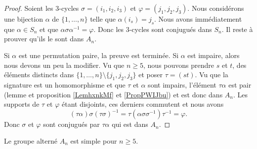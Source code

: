 \begin{proof}
    Soient les \( 3\)-cycles \( \sigma=(i_1,i_2,i_3)\) et \( \varphi=(j_1,j_2,j_3)\). Nous considérons une bijection \( \alpha\) de \( \{ 1,\ldots, n \}\) telle que \( \alpha(i_s)=j_s\). Nous avons immédiatement que \( \alpha\in S_n\) et que \( \alpha\sigma\alpha^{-1}=\varphi\). Donc les \( 3\)-cycles sont conjugués dans \( S_n\). Il reste à prouver qu'ils le sont dans \( A_n\).

    Si \( \alpha\) est une permutation paire, la preuve est terminée. Si \( \alpha\) est impaire, alors nous devons un peu la modifier. Vu que \( n\geq 5\), nous pouvons prendre \( s\) et \( t\), des éléments distincts dans \( \{ 1,\ldots, n \}\setminus\{ j_1,j_2,j_3 \}\) et poser \( \tau=(st)\). Vu que la signature est un homomorphisme et que \( \tau\) et \( \alpha\) sont impairs, l'élément \( \tau\alpha\) est pair (lemme et proposition \ref{LemhxnkMf} et \ref{PropPWIJbu}) et est donc dans \( A_n\). Les supports de \( \tau\) et \( \varphi\) étant disjoints, ces derniers commutent et nous avons
    \begin{equation}
        (\tau\alpha)\sigma(\tau\sigma)^{-1}=\tau(\alpha\sigma\sigma^{-1})\tau^{-1}=\varphi.
    \end{equation}
    Donc \( \sigma\) et \( \varphi\) sont conjugués par \( \tau\alpha\) qui est dans \( A_n\).
\end{proof}

\begin{theorem} \label{ThoURfSUXP}
    Le groupe alterné \( A_n\) est simple pour \( n\geq 5\).
\end{theorem}


